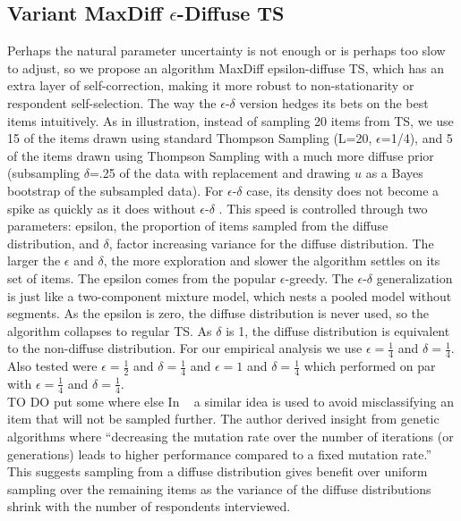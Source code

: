 \documentclass[nonblindrev]{informs3}
\begin{document}
\subsection{Variant MaxDiff $\epsilon$-Diffuse TS}
Perhaps the natural parameter uncertainty is not enough or is perhaps too slow to adjust, so we propose an algorithm MaxDiff epsilon-diffuse TS, which has an extra layer of self-correction, making it more robust to non-stationarity or respondent self-selection. 
The way the $\epsilon$-$\delta$ version hedges its bets on the best items intuitively. As in illustration, instead of sampling 20 items from TS, we use 15 of the items drawn using standard Thompson Sampling (L=20, $\epsilon$=1/4), and 5 of the items drawn using Thompson Sampling with a much more diffuse prior (subsampling $\delta$=.25 of the data with replacement and drawing $u$ as a Bayes bootstrap of the subsampled data).
For $\epsilon$-$\delta$ case, its density does not become a spike as quickly as it does without $\epsilon$-$\delta$ . This speed is controlled through two parameters: epsilon, the proportion of items sampled from the diffuse distribution, and $\delta$, factor increasing variance for the diffuse distribution.  The larger the $\epsilon$ and $\delta$, the more exploration and slower the algorithm settles on its set of items. The epsilon comes from the popular $\epsilon$-greedy.
The $\epsilon$-$\delta$  generalization is just like a two-component mixture model, which nests a pooled model without segments. As the epsilon is zero, the diffuse distribution is never used, so the algorithm collapses to regular TS. As $\delta$ is 1, the diffuse distribution is equivalent to the non-diffuse distribution. For our empirical analysis we use $\epsilon=\frac{1}{4}$ and $\delta=\frac{1}{4}$. Also tested were $\epsilon=\frac{1}{2}$ and $\delta=\frac{1}{4}$ and $\epsilon=1$ and $\delta=\frac{1}{4}$ which performed on par with $\epsilon=\frac{1}{4}$ and $\delta=\frac{1}{4}$.\\
TO DO put some where else  
In ~\cite{toubia2007adaptive} a similar idea is used to avoid misclassifying an item that will not be sampled further. The author derived insight from genetic algorithms where ``decreasing the mutation rate over the number of iterations (or generations) leads to higher performance compared to a fixed mutation rate.'' This suggests sampling from a diffuse distribution gives benefit over uniform sampling over the remaining items as the variance of the diffuse distributions shrink with the number of respondents interviewed.
\end{document}
